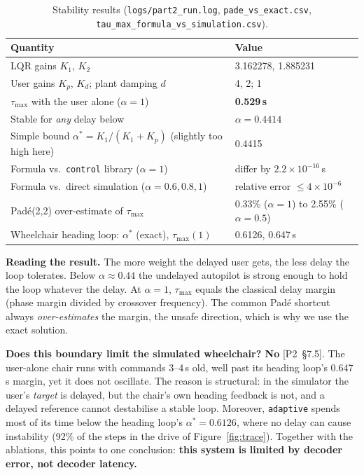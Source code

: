\documentclass[11pt,a4paper]{article}
\newcommand{\ptwo}[1]{{\small\textsf{[P2~\S#1]}}}
\newcommand{\code}[1]{\texttt{#1}}
\begin{document}
\begin{table}[H]
\centering\small
\begin{tabular}{@{}ll@{}}
\toprule
Quantity & Value \\
\midrule
LQR gains $K_1$, $K_2$ & 3.162278, 1.885231 \\
User gains $K_p$, $K_d$; plant damping $d$ & 4, 2; 1 \\
$\tau_{\max}$ with the user alone ($\alpha = 1$) & \textbf{0.529\,s} \\
Stable for \emph{any} delay below & $\alpha = 0.4414$ \\
Simple bound $\alpha^* = K_1/(K_1+K_p)$ (slightly too high here) & 0.4415 \\
Formula vs.\ \code{control} library ($\alpha = 1$) & differ by $2.2\times10^{-16}$\,s \\
Formula vs.\ direct simulation ($\alpha = 0.6, 0.8, 1$) & relative error $\le 4\times10^{-6}$ \\
Pad\'e(2,2) over-estimate of $\tau_{\max}$ & 0.33\% ($\alpha=1$) to 2.55\% ($\alpha=0.5$) \\
Wheelchair heading loop: $\alpha^*$ (exact), $\tau_{\max}(1)$ & 0.6126, 0.647\,s \\
\bottomrule
\end{tabular}
\caption{Stability results (\code{logs/part2\_run.log},
\code{pade\_vs\_exact.csv}, \code{tau\_max\_formula\_vs\_simulation.csv}).}
\label{tab:stab}
\end{table}

\textbf{Reading the result.} The more weight the delayed user gets, the
less delay the loop tolerates. Below $\alpha \approx 0.44$ the undelayed
autopilot is strong enough to hold the loop whatever the delay. At
$\alpha = 1$, $\tau_{\max}$ equals the classical delay margin (phase
margin divided by crossover frequency). The common Pad\'e shortcut always
\emph{over-estimates} the margin, the unsafe direction, which is why we use
the exact solution.

\textbf{Does this boundary limit the simulated wheelchair? No}
\ptwo{7.5}. The user-alone chair runs with commands 3--4\,s old, well past
its heading loop's 0.647\,s margin, yet it does not oscillate. The reason
is structural: in the simulator the user's \emph{target} is delayed, but
the chair's own heading feedback is not, and a delayed reference cannot
destabilise a stable loop. Moreover, \code{adaptive} spends most of its
time below the heading loop's $\alpha^* = 0.6126$, where no delay can
cause instability (92\% of the steps in the drive of
Figure~\ref{fig:trace}). Together with the ablations, this points to one
conclusion: \textbf{this system is limited by decoder error, not decoder
latency.}
\end{document}
